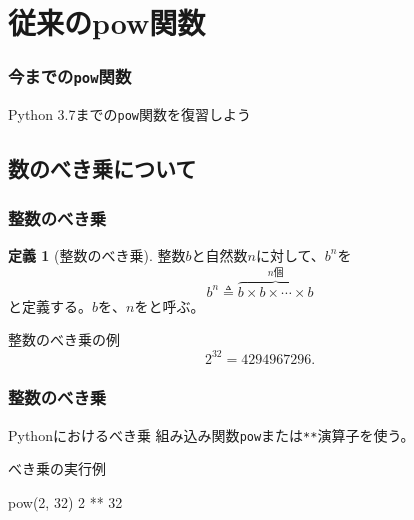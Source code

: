 \documentclass[aspectratio=169,dvipdfmx,14pt,notheorems]{beamer}
\theoremstyle{definition}
\newtheorem{definition}{定義}
\begin{document}
\section{従来のpow関数}

\begin{frame}\frametitle{今までの\texttt{pow}関数}
\begin{center}
\Large Python 3.7までの\texttt{pow}関数を復習しよう
\end{center}
\end{frame}

\subsection{数のべき乗について}

\begin{frame}\frametitle{整数のべき乗}
\begin{definition}[整数のべき乗]
整数$b$と自然数$n$に対して、$b^{n}$を
\begin{equation*}
b^{n} \triangleq \overbrace{b \times b \times \cdots \times b}^{n\text{個}}
\end{equation*}
と定義する。$b$を、$n$をと呼ぶ。
\end{definition}

\begin{exampleblock}{整数のべき乗の例}
\begin{equation*}
2^{32} = 4294967296.
\end{equation*}
\end{exampleblock}

\end{frame}

\begin{frame}[fragile]\frametitle{整数のべき乗}

\begin{block}{Pythonにおけるべき乗}
組み込み関数\texttt{pow}または\texttt{**}演算子を使う。
\end{block}

\begin{exampleblock}{べき乗の実行例}

\begin{pyconsole}
pow(2, 32)
2 ** 32
\end{pyconsole}

\end{exampleblock}

\end{frame}
\end{document}
